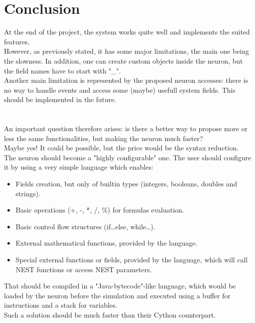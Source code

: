 \documentclass{article}
\begin{document}
\section{Conclusion}
At the end of the project, the system works quite well and implements the suited features.\\
However, as previously stated, it has some major limitations, the main one being the slowness. In addition, one can create custom objects inside the neuron, but the field names have to start with "\_".\\
Another main limitation is represented by the proposed neuron accesses: there is no way to handle events and access some (maybe) usefull system fields. This should be implemented in the future. \\ \\ \\
An important question therefore arises: is there a better way to propose more or less the same 
functionalities, but making the neuron much faster?\\
Maybe yes! It could be possible, but the price would be the syntax reduction. The neuron should become a "highly configurable" one. The user should configure it by using a very simple language which enables:
\begin{itemize}
\item Fields creation, but only of builtin types (integers, booleans, doubles and strings).
\item Basic operations (+, -, *, /, \%) for formulas evaluation.
\item Basic control flow structures (if\ldots else, while\ldots).
\item External mathematical functions, provided by the language.
\item Special external functions or fields, provided by the language, which will call NEST functions or access NEST parameters.
\end{itemize}
That should be compiled in a "Java-bytecode"-like language, which would be loaded by the neuron before the simulation and executed using a buffer for instructions and a stack for variables.\\
Such a solution should be much faster than their Cython counterpart.
\end{document}
